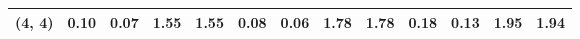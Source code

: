 \begin{tabular}{lrrrrrrrrrrrr}
(4, 4)        &                                               0.10 &                                            0.07 &                            1.55 &                                  1.55 &                                               0.08 &                                            0.06 &                            1.78 &                                  1.78 &                                               0.18 &                                            0.13 &                            1.95 &                                  1.94 \\
\bottomrule
\end{tabular}
